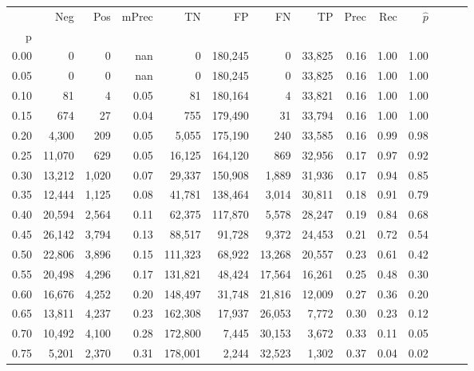 \begin{tabular}{rrrrrrrrrrrrrr}
\toprule
{} &     Neg &    Pos & mPrec &       TN &       FP &      FN &      TP &  Prec &   Rec & $\hat{p}$ \\
p    &         &        &       &          &          &         &         &       &       &           \\
\midrule
0.00 &       0 &      0 &   nan &        0 &  180,245 &       0 &  33,825 &  0.16 &  1.00 &      1.00 \\
0.05 &       0 &      0 &   nan &        0 &  180,245 &       0 &  33,825 &  0.16 &  1.00 &      1.00 \\
0.10 &      81 &      4 &  0.05 &       81 &  180,164 &       4 &  33,821 &  0.16 &  1.00 &      1.00 \\
0.15 &     674 &     27 &  0.04 &      755 &  179,490 &      31 &  33,794 &  0.16 &  1.00 &      1.00 \\
0.20 &   4,300 &    209 &  0.05 &    5,055 &  175,190 &     240 &  33,585 &  0.16 &  0.99 &      0.98 \\
0.25 &  11,070 &    629 &  0.05 &   16,125 &  164,120 &     869 &  32,956 &  0.17 &  0.97 &      0.92 \\
0.30 &  13,212 &  1,020 &  0.07 &   29,337 &  150,908 &   1,889 &  31,936 &  0.17 &  0.94 &      0.85 \\
0.35 &  12,444 &  1,125 &  0.08 &   41,781 &  138,464 &   3,014 &  30,811 &  0.18 &  0.91 &      0.79 \\
0.40 &  20,594 &  2,564 &  0.11 &   62,375 &  117,870 &   5,578 &  28,247 &  0.19 &  0.84 &      0.68 \\
0.45 &  26,142 &  3,794 &  0.13 &   88,517 &   91,728 &   9,372 &  24,453 &  0.21 &  0.72 &      0.54 \\
0.50 &  22,806 &  3,896 &  0.15 &  111,323 &   68,922 &  13,268 &  20,557 &  0.23 &  0.61 &      0.42 \\
0.55 &  20,498 &  4,296 &  0.17 &  131,821 &   48,424 &  17,564 &  16,261 &  0.25 &  0.48 &      0.30 \\
0.60 &  16,676 &  4,252 &  0.20 &  148,497 &   31,748 &  21,816 &  12,009 &  0.27 &  0.36 &      0.20 \\
0.65 &  13,811 &  4,237 &  0.23 &  162,308 &   17,937 &  26,053 &   7,772 &  0.30 &  0.23 &      0.12 \\
0.70 &  10,492 &  4,100 &  0.28 &  172,800 &    7,445 &  30,153 &   3,672 &  0.33 &  0.11 &      0.05 \\
0.75 &   5,201 &  2,370 &  0.31 &  178,001 &    2,244 &  32,523 &   1,302 &  0.37 &  0.04 &      0.02 \\

\end{tabular}
